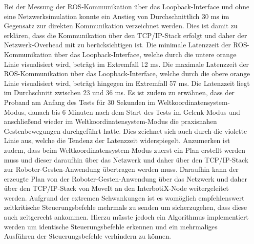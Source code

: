 Bei der Messung der ROS-Kommunikation über das Loopback-Interface und ohne eine Netzwerksimulation konnte ein Anstieg von Durchschnittlich 30 ms im Gegensatz zur direkten Kommunikation verzeichnet werden. Dies ist damit zu erklären, dass die Kommunikation über den TCP/IP-Stack erfolgt und daher der Netzwerk-Overhead mit zu berücksichtigen ist. Die minimale Latenzzeit der ROS-Kommunikation über das Loopback-Interface, welche durch die untere orange Linie visualisiert wird, beträgt im Extremfall \num{12} ms. Die maximale Latenzzeit der ROS-Kommunikation über das Loopback-Interface, welche durch die obere orange Linie visualisiert wird, beträgt hingegen im Extremfall \num{57} ms. Die Latenzzeit liegt im Durchschnitt zwischen 23 und 36 ms. Es ist zudem zu erwähnen, dass der Proband am Anfang des Tests für 30 Sekunden im Weltkoordinatensystem-Modus, danach bis 6 Minuten nach dem Start des Tests im Gelenk-Modus und anschließend wieder im Weltkoordinatensystem-Modus die praxisnahen Gestenbewegungen durchgeführt hatte. Dies zeichnet sich auch durch die violette Linie aus, welche die Tendenz der Latenzzeit widerspiegelt. Anzumerken ist zudem, dass beim Weltkoordinatensystem-Modus zuerst ein Plan erstellt werden muss und dieser daraufhin über das Netzwerk und daher über den TCP/IP-Stack zur Roboter-Gesten-Anwendung übertragen werden muss. Daraufhin kann der erzeugte Plan von der Roboter-Gesten-Anwendung über das Netzwerk und daher über den TCP/IP-Stack von MoveIt an den InterbotiX-Node weitergeleitet werden. Aufgrund der extremen Schwankungen ist es womöglich empfehlenswert zeitkritische Steuerungsbefehle mehrmals zu senden um sicherzugehen, dass diese auch zeitgerecht ankommen. Hierzu müsste jedoch ein Algorithmus implementiert werden um identische Steuerungsbefehle erkennen und ein mehrmaliges Ausführen der Steuerungsbefehle verhindern zu können.


